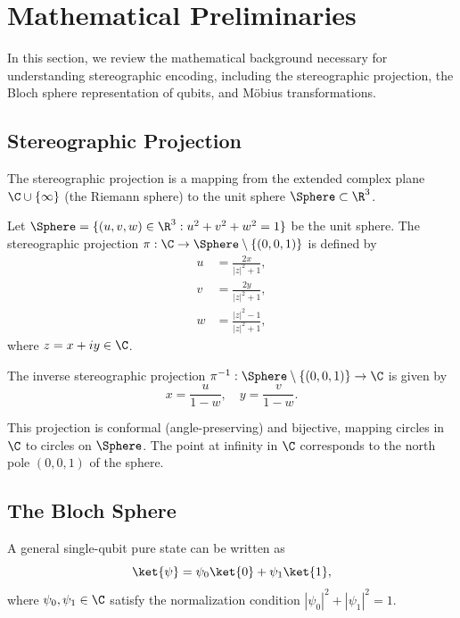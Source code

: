 \section{Mathematical Preliminaries}
\label{sec:preliminaries}

In this section, we review the mathematical background necessary for understanding stereographic encoding, including the stereographic projection, the Bloch sphere representation of qubits, and Möbius transformations.

\subsection{Stereographic Projection}

The stereographic projection is a mapping from the extended complex plane $\C \cup \{\infty\}$ (the Riemann sphere) to the unit sphere $\Sphere \subset \R^3$.

\begin{definition}
Let $\Sphere = \{(u,v,w) \in \R^3 : u^2 + v^2 + w^2 = 1\}$ be the unit sphere. The stereographic projection $\pi: \C \to \Sphere \setminus \{(0,0,1)\}$ is defined by
\begin{align}
    u &= \frac{2x}{|z|^2 + 1}, \\
    v &= \frac{2y}{|z|^2 + 1}, \\
    w &= \frac{|z|^2 - 1}{|z|^2 + 1},
\end{align}
where $z = x + iy \in \C$.
\end{definition}

The inverse stereographic projection $\pi^{-1}: \Sphere \setminus \{(0,0,1)\} \to \C$ is given by
\begin{equation}
    x = \frac{u}{1-w}, \quad y = \frac{v}{1-w}.
\end{equation}

This projection is conformal (angle-preserving) and bijective, mapping circles in $\C$ to circles on $\Sphere$. The point at infinity in $\C$ corresponds to the north pole $(0,0,1)$ of the sphere.

\subsection{The Bloch Sphere}

A general single-qubit pure state can be written as
\begin{equation}
    \ket{\psi} = \psi_0 \ket{0} + \psi_1 \ket{1},
\end{equation}
where $\psi_0, \psi_1 \in \C$ satisfy the normalization condition $|\psi_0|^2 + |\psi_1|^2 = 1$.

